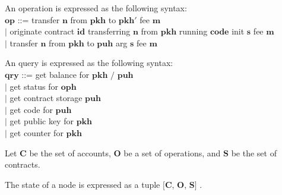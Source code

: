 \documentclass[a4paper]{llncs}
\begin{document}
\begin{definition}[Operation]
An operation is expressed as the following syntax:
\\
$\mathbf{op}$ ::= transfer  $\mathbf{n}$ from $\mathbf{pkh}$ to $\mathbf{pkh'}$ fee $\mathbf{m}$
\\$\mid$ originate contract $\mathbf{id}$ transferring  $\mathbf{n}$ from $\mathbf{pkh}$ running $\mathbf{code}$ init $\mathbf{s}$ fee $\mathbf{m}$
\\$\mid$ transfer $\mathbf{n}$ from $\mathbf{pkh}$ to  $\mathbf{puh}$ arg $\mathbf{s}$ fee $\mathbf{m}$
\end{definition}

\begin{definition}[Query]
An query is expressed as the following syntax:
\\
$\mathbf{qry}$ ::= get balance for $\mathbf{pkh}$ $/$ $\mathbf{puh}$
\\$\mid$ get status for $\mathbf{oph}$ 
\\$\mid$ get contract storage $\mathbf{puh}$ 
\\$\mid$ get code for $\mathbf{puh}$ 
\\$\mid$ get public key for $\mathbf{pkh}$
\\$\mid$ get counter for $\mathbf{pkh}$

\end{definition}
Let $\mathbf{C}$ be the set of accounts,   $\mathbf{O}$ be a set of operations, and $\mathbf{S}$ be the set of contracts. 
 \begin{definition}
The state of a node is expressed as a tuple $[$$\mathbf{C}$, $\mathbf{O}$, $\mathbf{S}$$]$ .
\end{definition}
\end{document}
